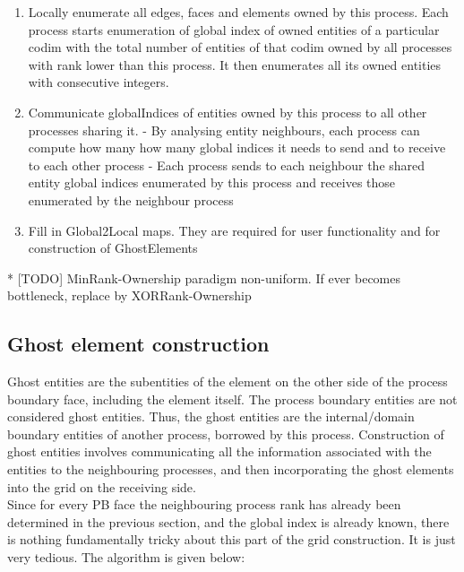 \begin{enumerate}
    \item Locally enumerate all edges, faces and elements owned by this process. Each process starts enumeration of global index of owned entities of a particular codim with the total number of entities of that codim owned by all processes with rank lower than this process. It then enumerates all its owned entities with consecutive integers. 
    \item Communicate globalIndices of entities owned by this process to all other processes sharing it.
       \subitem - By analysing entity neighbours, each process can compute how many how many global indices it needs to send and to receive to each other process
       \subitem - Each process sends to each neighbour the shared entity global indices enumerated by this process and receives those enumerated by the neighbour process
    \item Fill in Global2Local maps. They are required for user functionality and for construction of GhostElements

	
\end{enumerate}

     * [TODO] MinRank-Ownership paradigm non-uniform. If ever becomes bottleneck, replace by XORRank-Ownership








\subsection{Ghost element construction}
\label{impl-grid-constructor-ghost}

\noindent
Ghost entities are the subentities of the element on the other side of the process boundary face, including the element itself. The process boundary entities are not considered ghost entities. Thus, the ghost entities are the internal/domain boundary entities of another process, borrowed by this process. Construction of ghost entities involves communicating all the information associated with the entities to the neighbouring processes, and then incorporating the ghost elements into the grid on the receiving side. \\

\noindent
Since for every PB face the neighbouring process rank has already been determined in the previous section, and the global index is already known, there is nothing fundamentally tricky about this part of the grid construction. It is just very tedious. The algorithm is given below:



